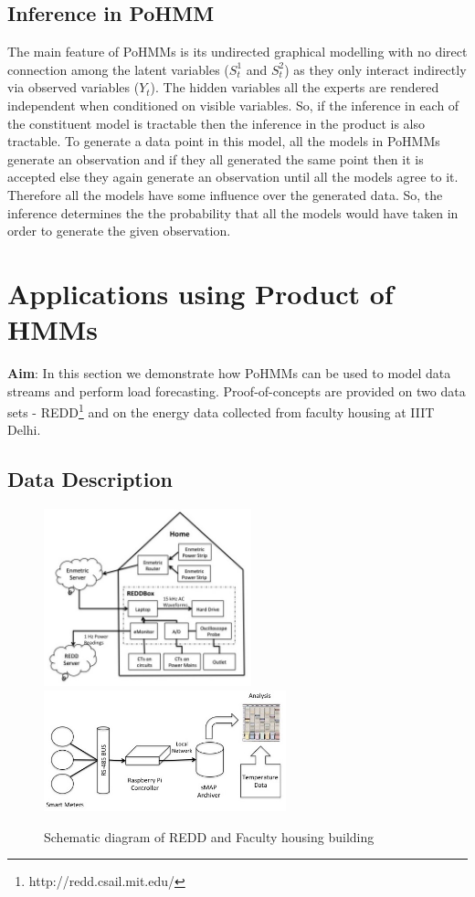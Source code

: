 \documentclass{acm_proc_article-sp}
\begin{document}
 \subsection{Inference in PoHMM}

The main feature of PoHMMs is its undirected graphical modelling with no direct connection among the latent variables ($S^1_{t}$ and $S^2_{t}$) as they only interact indirectly via observed variables ($Y_{t}$). The hidden variables all the experts are rendered independent when conditioned on visible variables. So, if the inference in each of the constituent model is tractable then the inference in the product is also tractable. To generate a data point in this model, all the models in PoHMMs generate an observation and if they all generated the same point then it is accepted else they again generate an observation until all the models agree to it. Therefore all the models have some influence over the generated data. So, the inference determines the the probability that all the models would have taken in order to generate the given observation. 



\section{Applications using Product of HMMs}
\label{poc}

\textbf{Aim}: In this section we demonstrate how PoHMMs can be used to model data streams and perform load forecasting. Proof-of-concepts are provided on two data sets - REDD\footnote{http://redd.csail.mit.edu/} and on the energy data collected from faculty housing at IIIT Delhi.

\subsection{Data Description} 
\begin{figure}
\centering
\includegraphics[width=6cm]{./REDD_img}
\includegraphics[width=7cm]{./FHschema}
\caption{Schematic diagram of REDD and Faculty housing building}
\label{fig:FH}
\end{figure}
\end{document}
